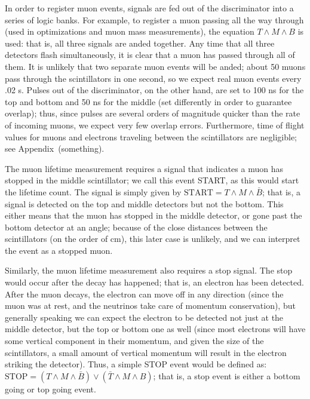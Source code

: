 In order to register muon events, signals are fed out of the discriminator into a series of logic banks. For example, to register a muon passing all the way through (used in optimizations and muon mass measurements), the equation $T \wedge M \wedge B$ is used: that is, all three signals are anded together. Any time that all three detectors flash simultaneously, it is clear that a muon has passed through all of them. It is unlikely that two separate muon events will be anded; about 50 muons pass through the scintillators in one second, so we expect real muon events every .02 s. Pulses out of the discriminator, on the other hand, are set to 100 ns for the top and bottom and 50 ns for the middle (set differently in order to guarantee overlap); thus, since pulses are several orders of magnitude quicker than the rate of incoming muons, we expect very few overlap errors. Furthermore, time of flight values for muons and electrons traveling between the scintillators are negligible; see Appendix~(something).

The muon lifetime measurement requires a signal that indicates a muon has stopped in the middle scintillator; we call this event START, as this would start the lifetime count. The signal is simply given by $\mathrm{START} = T \wedge M \wedge \bar{B}$; that is, a signal is detected on the top and middle detectors but not the bottom. This either means that the muon has stopped in the middle detector, or gone past the bottom detector at an angle; because of the close distances between the scintillators (on the order of cm), this later case is unlikely, and we can interpret the event as a stopped muon.


Similarly, the muon lifetime measurement also requires a stop signal. The stop would occur after the decay has happened; that is, an electron has been detected. After the muon decays, the electron can move off in any direction (since the muon was at rest, and the neutrinos take care of momentum conservation), but generally speaking we can expect the electron to be detected not just at the middle detector, but the top or bottom one as well (since most electrons will have some vertical component in their momentum, and given the size of the scintillators, a small amount of vertical momentum will result in the electron striking the detector). Thus, a simple STOP event would be defined as: $\mathrm{STOP} = (T \wedge M \wedge \bar{B}) \vee (\bar{T} \wedge M \wedge B)$; that is, a stop event is either a bottom going or top going event.

